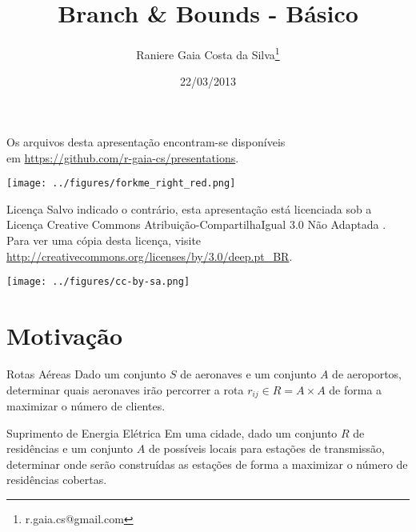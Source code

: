 \documentclass[11pt]{beamer}
\begin{document}
\title[Branch \& Bounds - Básico]{Branch \& Bounds - Básico}
\author[Raniere Silva]{Raniere Gaia Costa da
Silva\footnote{r.gaia.cs@gmail.com}}
\date{22/03/2013}

\begin{frame}
  \maketitle
\end{frame}

\begin{frame}
  \begin{block}{}
    Os arquivos desta apresentação encontram-se disponíveis \\
    em \url{https://github.com/r-gaia-cs/presentations}. \\
    \vspace{-33pt}
    \begin{flushright}
      \texttt{[image: ../figures/forkme\_right\_red.png]}
    \end{flushright}
  \end{block}

  \begin{block}{Licença}
    Salvo indicado o contrário, esta apresentação está licenciada sob a
    Licença Creative Commons Atribuição-CompartilhaIgual 3.0 Não Adaptada .
    Para ver uma cópia desta licença, visite
    \url{http://creativecommons.org/licenses/by/3.0/deep.pt_BR}.
    \begin{center}
      \texttt{[image: ../figures/cc-by-sa.png]}
    \end{center}
  \end{block}
\end{frame}

\begin{frame}
    \tableofcontents
\end{frame}

\section{Motivação}
\begin{frame}{Rotas Aéreas}
  Dado um conjunto $S$ de aeronaves e um conjunto $A$ de aeroportos, determinar
  quais aeronaves irão percorrer a rota $r_{ij} \in R = A \times A$ de forma a maximizar
  o número de clientes.
\end{frame}

\begin{frame}{Suprimento de Energia Elétrica}
  Em uma cidade, dado um conjunto $R$ de residências e um conjunto $A$ de
  possíveis locais para estações de transmissão, determinar onde serão
  construídas as estações de forma a maximizar o número de residências cobertas.
\end{frame}
\end{document}
